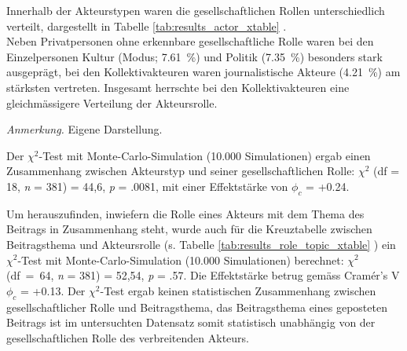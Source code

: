 \documentclass[12pt,a4paper]{article}        %
\begin{document}
Innerhalb der Akteurstypen waren die gesellschaftlichen Rollen unterschiedlich verteilt, dargestellt in Tabelle \ref{tab:results_actor_xtable} .\\
Neben Privatpersonen ohne erkennbare gesellschaftliche Rolle waren bei den Einzelpersonen Kultur (Modus; 7.61 \%) und Politik (7.35 \%) besonders stark ausgeprägt, bei den Kollektivakteuren waren journalistische Akteure (4.21 \%) am stärksten vertreten. Insgesamt herrschte bei den Kollektivakteuren eine gleichmässigere Verteilung der Akteursrolle.
\begin{table}[H]
  \centering
  \caption{\textit{Kreuztabelle zwischen Akteurstyp und gesellschaftlicher Rolle}}
  \label{tab:results_actor_xtable}
  \footnotesize\textit{Anmerkung.} Eigene Darstellung.
\end{table}

Der \(\chi^2\)-Test mit Monte-Carlo-Simulation (10.000 Simulationen) ergab einen Zusammenhang zwischen Akteurstyp und seiner gesellschaftlichen Rolle: \(\chi^2\) (df = 18, \textit{n} = 381) = 44,6, \textit{p} = .0081, mit einer Effektstärke von \(\phi_c\) = +0.24.

\pagebreak
Um herauszufinden, inwiefern die Rolle eines Akteurs mit dem Thema des Beitrags in Zusammenhang steht, wurde auch für die Kreuztabelle zwischen Beitragsthema und Akteursrolle (s. Tabelle \ref{tab:results_role_topic_xtable} ) ein \(\chi^2\)-Test mit Monte-Carlo-Simulation (10.000 Simulationen) berechnet:  \(\chi^2\) (df = 64, \textit{n} = 381) = 52,54, \textit{p} = .57. Die Effektstärke betrug gemäss Cramér's V \(\phi_c\) = +0.13. Der \(\chi^2\)-Test ergab keinen statistischen Zusammenhang zwischen gesellschaftlicher Rolle und Beitragsthema, das Beitragsthema eines geposteten Beitrags ist im untersuchten Datensatz somit statistisch unabhängig von der gesellschaftlichen Rolle des verbreitenden Akteurs.
\end{document}
